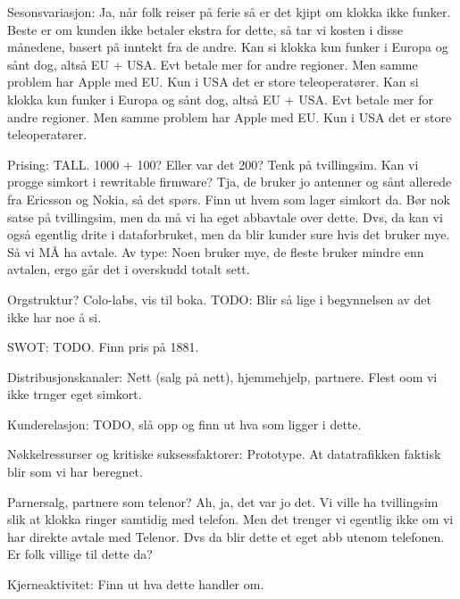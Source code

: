 Sesonsvariasjon: Ja, når folk reiser på ferie så er det kjipt om klokka ikke
funker. Beste er om kunden ikke betaler ekstra for dette, så tar vi kosten i
disse månedene, basert på inntekt fra de andre.  Kan si klokka kun funker i
Europa og sånt dog, altså EU + USA. Evt betale mer for andre regioner. Men
samme problem har Apple med EU. Kun i USA det er store teleoperatører.  Kan si
klokka kun funker i Europa og sånt dog, altså EU + USA. Evt betale mer for
andre regioner. Men samme problem har Apple med EU. Kun i USA det er store
teleoperatører.

Prising: TALL. 1000 + 100? Eller var det 200? Tenk på tvillingsim. Kan vi
progge simkort i rewritable firmware? Tja, de bruker jo antenner og sånt
allerede fra Ericsson og Nokia, så det spørs. Finn ut hvem som lager simkort
da. Bør nok satse på tvillingsim, men da må vi ha eget abbavtale over dette.
Dvs, da kan vi også egentlig drite i dataforbruket, men da blir kunder sure
hvis det bruker mye. Så vi MÅ ha avtale. Av type: Noen bruker mye, de fleste
bruker mindre enn avtalen, ergo går det i overskudd totalt sett.

Orgstruktur? Colo-labs, vis til boka. TODO: Blir så lige i begynnelsen av det
ikke har noe å si.

SWOT: TODO. Finn pris på 1881.

Distribusjonskanaler: Nett (salg på nett), hjemmehjelp, partnere. Flest oom vi
ikke trnger eget simkort.

Kunderelasjon: TODO, slå opp og finn ut hva som ligger i dette.

Nøkkelressurser og kritiske suksessfaktorer: Prototype. At datatrafikken
faktisk blir som vi har beregnet.

Parnersalg, partnere som telenor? Ah, ja, det var jo det. Vi ville ha
tvillingsim slik at klokka ringer samtidig med telefon. Men det trenger vi
egentlig ikke om vi har direkte avtale med Telenor. Dvs da blir dette et eget
abb utenom telefonen. Er folk villige til dette da?

Kjerneaktivitet: Finn ut hva dette handler om.












